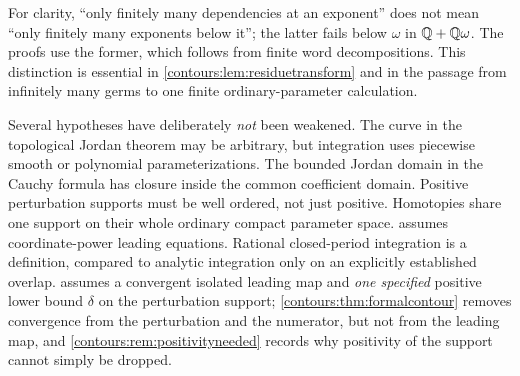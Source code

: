 \documentclass[11pt,letterpaper]{article}
\theoremstyle{definition}
\theoremstyle{remark}
\numberwithin{equation}{section}
\begin{document}
For clarity, ``only finitely many dependencies at an exponent'' does not mean ``only
finitely many exponents below it''; the latter fails below $\omega$ in
$\mathbb Q+\mathbb Q\omega$. The proofs use the former, which follows from finite word
decompositions. This distinction is essential in
\cref{contours:lem:residuetransform} and in the passage from infinitely many germs to
one finite ordinary-parameter calculation.

Several hypotheses have deliberately \emph{not} been weakened. The curve in the
topological Jordan theorem may be arbitrary, but integration uses piecewise smooth or
polynomial parameterizations. The bounded Jordan domain in the Cauchy formula has
closure inside the common coefficient domain. Positive perturbation supports must be
well ordered, not just positive. Homotopies share one support on their whole ordinary
compact parameter space.  assumes coordinate-power
leading equations. Rational closed-period integration is a definition, compared to
analytic integration only on an explicitly established overlap.
 assumes a convergent isolated leading map and
\emph{one specified} positive lower bound $\delta$ on the perturbation support;
\cref{contours:thm:formalcontour} removes convergence from the perturbation and
the numerator, but not from the leading map, and
\cref{contours:rem:positivityneeded} records why positivity of the support cannot
simply be dropped.
\end{document}

